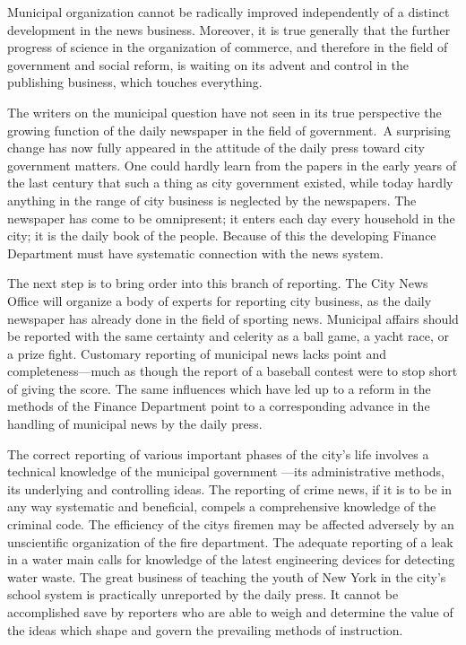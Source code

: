 \documentclass[twoside,symmetric,nobib,justified]{tufte-book}
\begin{document}
Municipal organization cannot be radically improved independently of a
distinct development in the news business. Moreover, it is true
generally that the further progress of science in the organization of
commerce, and therefore in the field of government and social reform, is
waiting on its advent and control in the publishing business, which
touches everything.~

The writers on the municipal question have not seen in its true
perspective the growing function of the daily newspaper in the field of
government.~A surprising change has now fully appeared in the attitude
of the daily press toward city government matters. One could hardly
learn from the papers in the early years of the last century that such a
thing as city government existed, while today hardly anything in the
range of city business is neglected by the newspapers. The newspaper has
come to be omnipresent; it enters each day every household in the city;
it is the daily book of the people. Because of this the developing
Finance Department must have systematic connection with the news
system.~

The next step is to bring order into this branch of reporting. The City
News Office will organize a body of experts for reporting city business,
as the daily newspaper has already done in the field of sporting news.
Municipal affairs should be reported with the same certainty and
celerity as a ball game, a yacht race, or a prize fight. Customary
reporting of municipal news lacks point and completeness---much as
though the report of a baseball contest were to stop short of giving the
score. The same influences which have led up to a reform in the methods
of the Finance Department point to a corresponding advance in the
handling of municipal news by the daily press.~

The correct reporting of various important phases of the city's life
involves a technical knowledge of the municipal government ---its
administrative methods, its underlying and controlling ideas. The
reporting of crime news, if it is to be in any way systematic and
beneficial, compels a comprehensive knowledge of the criminal code. The
efficiency of the city\textquotesingle s firemen may be affected
adversely by an unscientific organization of the fire department. The
adequate reporting of a leak in a water main calls for knowledge of the
latest engineering devices for detecting water waste. The great business
of teaching the youth of New York in the city's school system is
practically unreported by the daily press. It cannot be accomplished
save by reporters who are able to weigh and determine the value of the
ideas which shape and govern the prevailing methods of instruction.~
\end{document}
